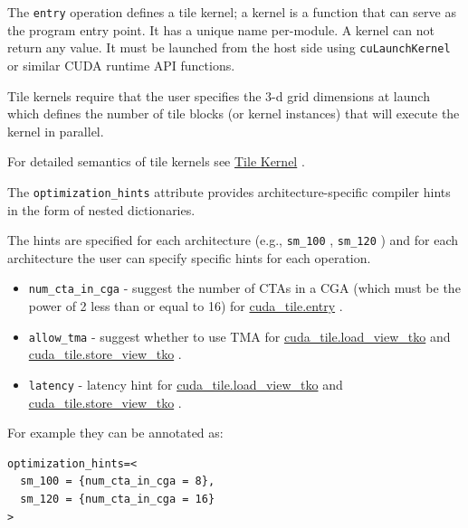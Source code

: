 \documentclass{article}
\begin{document}
The \texttt{entry} operation defines a tile kernel; a kernel is a function that can serve as the program entry point. It has a unique name per-module. A kernel can not return any value. It must be launched from the host side using \texttt{cuLaunchKernel} or similar CUDA runtime API functions.


Tile kernels require that the user specifies the 3-d grid dimensions at launch which defines the number of tile blocks (or kernel instances) that will execute the kernel in parallel.


For detailed semantics of tile kernels see \href{https://docs.nvidia.com/cuda/tile-ir/latest/sections/semantics.html#sub-sec-tile-kernel}{Tile Kernel} .


The \texttt{optimization\_hints} attribute provides architecture-specific compiler hints in the form of nested dictionaries.


The hints are specified for each architecture (e.g., \texttt{sm\_100} , \texttt{sm\_120} ) and for each architecture the user can specify specific hints for each operation.


\begin{itemize}
\item \texttt{num\_cta\_in\_cga} - suggest the number of CTAs in a CGA (which must be the power of 2 less than or equal to 16) for \href{https://docs.nvidia.com/cuda/tile-ir/latest/sections/operations.html#op-cuda-tile-entry}{cuda\_tile.entry} .
\item \texttt{allow\_tma} - suggest whether to use TMA for \href{https://docs.nvidia.com/cuda/tile-ir/latest/sections/operations.html#op-cuda-tile-load-view-tko}{cuda\_tile.load\_view\_tko} and \href{https://docs.nvidia.com/cuda/tile-ir/latest/sections/operations.html#op-cuda-tile-store-view-tko}{cuda\_tile.store\_view\_tko} .
\item \texttt{latency} - latency hint for \href{https://docs.nvidia.com/cuda/tile-ir/latest/sections/operations.html#op-cuda-tile-load-view-tko}{cuda\_tile.load\_view\_tko} and \href{https://docs.nvidia.com/cuda/tile-ir/latest/sections/operations.html#op-cuda-tile-store-view-tko}{cuda\_tile.store\_view\_tko} .

\end{itemize}
For example they can be annotated as:


\begin{lstlisting}
optimization_hints=<
  sm_100 = {num_cta_in_cga = 8},
  sm_120 = {num_cta_in_cga = 16}
>
\end{lstlisting}
\end{document}
